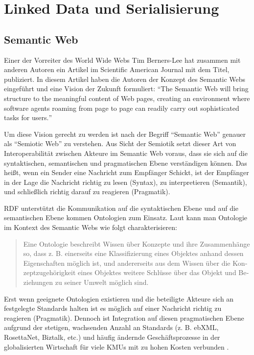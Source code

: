 \section{Linked Data und Serialisierung}
\label{sec:linked-data-serialisierung}

\subsection{Semantic Web}
\label{sec:semantic-web}

Einer der Vorreiter des World Wide Webs Tim Berners-Lee hat zusammen mit anderen Autoren \citeyear{berners2001semantic} ein Artikel im Scientific American Journal mit dem Titel,  publiziert. In diesem Artikel haben die Autoren der Konzept des Semantic Webs eingeführt und eine Vision der Zukunft formuliert: \hyphenquote{german}{The Semantic Web will bring structure to the meaningful content of Web pages, creating an environment where software agents roaming from page to page can readily carry out sophisticated tasks for users.}

Um diese Vision gerecht zu werden ist nach \citeauthor{blumauer2006semantic} der Begriff \hyphenquote{german}{Semantic Web} genauer als \hyphenquote{german}{Semiotic Web} zu verstehen. Aus Sicht der Semiotik setzt dieser Art von Interoperabilität zwischen Akteure im Semantic Web voraus, dass sie sich auf die syntaktischen, semantischen und pragmatischen Ebene verständigen können. Das heißt, wenn ein Sender eine Nachricht zum Empfänger Schickt, ist der Empfänger in der Lage die Nachricht richtig zu lesen (Syntax), zu interpretieren (Semantik), und schließlich richtig darauf zu reagieren (Pragmatik)\parencite[vgl.]{voigtmann2002enterprise}. 

RDF unterstützt die Kommunikation auf die syntaktischen Ebene und auf die semantischen Ebene kommen Ontologien zum Einsatz. Laut \citeauthor[S.~488]{may2006semantic} kann man Ontologie im Kontext des Semantic Webs wie folgt charakterisieren: \hyphenblockquote{german}{Eine Ontologie beschreibt Wissen über Konzepte und ihre Zusammenhänge so, dass z. B. einerseits eine Klassifizierung eines Objektes anhand dessen Eigenschaften möglich ist, und andererseits aus dem Wissen über die Konzeptzugehörigkeit eines Objektes weitere Schlüsse über das Objekt und Beziehungen zu seiner Umwelt möglich sind.} Erst wenn geeignete Ontologien existieren und die beteiligte Akteure sich an festgelegte Standards halten ist es möglich auf einer Nachricht richtig zu reagieren (Pragmatik). Dennoch ist Integration auf diesen pragmatischen Ebene aufgrund der stetigen, wachsenden Anzahl an Standards (z. B. ebXML, RosettaNet, Biztalk, etc.) und häufig ändernde Geschäftsprozesse in der globalisierten Wirtschaft für viele KMUs mit zu hohen Kosten verbunden \parencite[vgl.][S.~4ff]{rebstock2008ontologies}.

